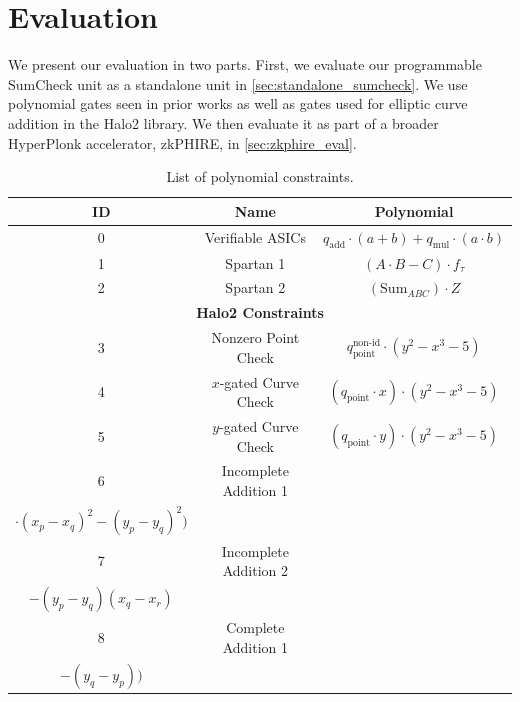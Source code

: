 
\section{Evaluation}
\label{sec:Evaluation}
We present our evaluation in two parts. First, we evaluate our programmable SumCheck unit as a standalone unit in \autoref{sec:standalone_sumcheck}. We use polynomial gates seen in prior works \cite{verifiable_asics, spartan} as well as gates used for elliptic curve addition in the Halo2 \cite{halo2} library. We then evaluate it as part of a broader HyperPlonk accelerator, zkPHIRE, in \autoref{sec:zkphire_eval}.


\begin{table}[t]
    \caption{List of polynomial constraints.}
    \label{tab:polynomials}
    \centering
    \begin{tabular}{|c|c|c|}
        \hline
        \textbf{ID} & \textbf{Name} & \textbf{Polynomial} \\
        \hline
        0 & Verifiable ASICs \cite{verifiable_asics} & $q_{\text{add}}\cdot(a + b) + q_{\text{mul}}\cdot(a \cdot b)$ \\
        \hline
        1 & Spartan 1 \cite{spartan} & $(A \cdot B - C) \cdot f_\tau$ \\
        \hline
        2 & Spartan 2 \cite{spartan} & $(\text{Sum}_{ABC}) \cdot Z$ \\
        \hline
        \multicolumn{3}{|c|}{\textbf{Halo2 Constraints \cite{halo2}}} \\
        \hline
        3 & Nonzero Point Check & $q_\text{point}^\text{non-id} \cdot (y^2 - x^3 - 5)$ \\
        \hline
        4 & $x$-gated Curve Check & $(q_\text{point} \cdot x) \cdot (y^2 - x^3 - 5)$ \\
        \hline
        5 & $y$-gated Curve Check & $(q_\text{point} \cdot y) \cdot (y^2 - x^3 - 5)$ \\
        \hline
        6 & Incomplete Addition 1 & \makecell[c]{$q_\text{add-incomplete} \cdot ((x_r + x_q + x_p) $ \\  $\cdot(x_p - x_q)^2 - (y_p - y_q)^2)$} \\
        \hline
        7 & Incomplete Addition 2 & \makecell[c]{$q_\text{add-incomplete} \cdot  (y_r + y_q)(x_p - x_q)$ \\ $- (y_p - y_q)(x_q - x_r)$} \\
        \hline
        8 & Complete Addition 1 & \makecell[c]{$q_\text{add} \cdot (x_q - x_p)((x_q - x_p)\lambda$ \\ $- (y_q - y_p))$} \\

\end{tabular}
\end{table}
